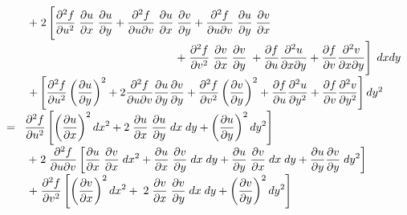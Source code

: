\begin{example}
\begin{enumerate}
\begin{enumerate}
\begin{tabbing}
\> $ \hspace{0.7cm} +\; 2 \left[\displaystyle\frac{\partial^2 f}{\partial u^2}\;\displaystyle\frac{\partial u}{\partial x} \;\displaystyle\frac{\partial u}{\partial y}+\displaystyle\frac{\partial^2 f}{\partial u \partial v} \;\displaystyle\frac{\partial u}{\partial x} \;\displaystyle\frac{\partial v}{\partial y}+ \displaystyle\frac{\partial^2 f}{\partial u \partial v}\;\displaystyle\frac{\partial u}{\partial y}\;\displaystyle\frac{\partial v}{\partial x}\right.$\\[0.18cm]
\>$ \left. \hspace{5.3cm} +\;
\ds\frac{\partial^2 f}{\partial v^2}\;\ds\frac{\partial v}{\partial x} \;\ds\frac{\partial v}{\partial y}\;+
\ds\frac{\partial f}{\partial u}\ds\frac{\partial^2 u}{\partial x \partial y}+\ds\frac{\partial f}{\partial v}\ds\frac{\partial^2 v}{\partial x \partial y}\right] \; dx dy $\\[0.18cm]
\> $ \hspace{0.7cm} + \left[\displaystyle\frac{\partial^2 f}{\partial u^2} \left(\displaystyle\frac{\partial u}{\partial y} \right)^2+ 2 \displaystyle\frac{\partial^2 f}{\partial u \partial v}\displaystyle\frac{\partial u}{\partial y} \displaystyle\frac{\partial v}{\partial y} +
\displaystyle\frac{\partial^2 f}{\partial v^2} \left(\displaystyle\frac{\partial v}{\partial y} \right)^2+\displaystyle\frac{\partial f}{\partial u}
\displaystyle\frac{\partial^2 u}{\partial y^2} +\displaystyle\frac{\partial f}{\partial v} \displaystyle\frac{\partial^2 v}{\partial y^2} \right]  dy^2$\\[0.18cm]
\> $ = \;\;  \displaystyle\frac{\partial^2 f}{\partial u^2} \left[\left(\displaystyle\frac{\partial u}{\partial x} \right )^2 dx^2+ 2 \;
\displaystyle\frac{\partial u}{\partial x} \;\displaystyle\frac{\partial u}{\partial y} \; dx \; dy +\left(\displaystyle\frac{\partial u}{\partial y} \right)^2  dy^2\right ] $\\[0.18cm]
\> $ \hspace{0.7cm} + \; 2 \; \displaystyle\frac{\partial^2 f}{\partial u \partial v} \left[\displaystyle\frac{\partial u}{\partial x} \;
\displaystyle\frac{\partial v}{\partial x} \; dx^2+\displaystyle\frac{\partial u}{\partial x} \;\displaystyle\frac{\partial v}{\partial y} \; dx \; dy
+\displaystyle\frac{\partial u}{\partial y} \;\displaystyle\frac{\partial v}{\partial x} \; dx \; dy+\displaystyle\frac{\partial u}{\partial y}\displaystyle\frac{\partial v}{\partial y} \; dy^2\right] $\\[0.18cm] 
\> $ \hspace{0.7cm} +\;\displaystyle\frac{\partial^2 f}{\partial v^2} \left[ \left(\displaystyle\frac{\partial v}{\partial x} \right )^2  dx^2
+ \; 2 \;\displaystyle\frac{\partial v}{\partial x} \;\displaystyle\frac{\partial v}{\partial y} \;dx \; dy +\left(\displaystyle\frac{\partial v}{\partial y} \right )^2 dy^2\right ]$\\[0.18cm]

\end{tabbing}
\end{enumerate}
\end{enumerate}
\end{example}
